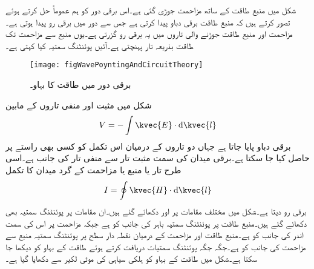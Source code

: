 
شکل  میں منبع طاقت کے ساتھ مزاحمت  جوڑی گئی ہے۔اس برقی دور کو ہم عموماً حل کرتے ہوئے تصور کرتے ہیں کہ منبع طاقت برقی دباو  پیدا کرتی ہے جس سے  دور میں برقی رو  پیدا ہوتی ہے۔مزاحمت اور منبع طاقت جوڑنے والی تاروں میں یہ برقی رو گزرتی ہے۔یوں منبع سے مزاحمت تک  طاقت بذریعہ تار پہنچتی ہے۔آئیں پوئنٹنگ سمتیہ کیا کہتی ہے۔
\begin{figure}
\centering
\texttt{[image: figWavePoyntingAndCircuitTheory]}
\caption{برقی دور میں طاقت کا بہاو۔}
\label{شکل_مستوی_برقی_دور_طاقت_بہاو}
\end{figure}

شکل  میں مثبت اور منفی تاروں کے مابین
\begin{align}
V=-\int \kvec{E} \cdot \dif \kvec{l}
\end{align}
برقی دباو پایا جاتا ہے جہاں دو تاروں کے درمیان اس تکمل کو کسی بھی راستے پر حاصل کیا جا سکتا ہے۔برقی میدان  کی سمت مثبت تار سے منفی تار کی  جانب ہے۔اسی طرح تار یا منبع یا مزاحمت کے گرد میدان کا تکمل
\begin{align}
I=\oint \kvec{H} \cdot \dif \kvec{l}
\end{align}
برقی رو دیتا ہے۔شکل میں مختلف مقامات پر  اور  دکھائے گئے ہیں۔ان مقامات پر پوئنٹنگ سمتیہ  بھی دکھائے گئے ہیں۔منبع طاقت پر پوئنٹنگ سمتیہ باہر کی جانب کو ہے جبکہ مزاحمت پر اس کی سمت اندر کی جانب کو ہے۔منبع طاقت اور مزاحمت کے درمیان نقطہ دار سطح پر پوئنٹنگ سمتیہ منبع سے مزاحمت کی جانب کو ہے۔جگہ جگہ پوئنٹنگ سمتیات دریافت کرتے ہوئے طاقت کے بہاو کو دیکھا جا سکتا ہے۔شکل میں طاقت کے بہاو کو ہلکی سیاہی کی موٹی لکیر سے دکھایا گیا ہے۔

